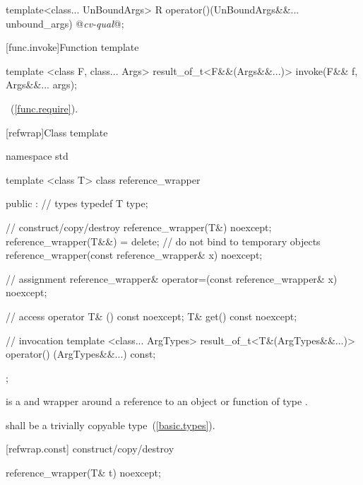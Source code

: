 \begin{codeblock}
template<class... UnBoundArgs>
R operator()(UnBoundArgs&&... unbound_args) @\textit{cv-qual}@;
\end{codeblock}
\exitnote

[func.invoke]{Function template }
%
%
\begin{itemdecl}
template <class F, class... Args>
  result_of_t<F&&(Args&&...)> invoke(F&& f, Args&&... args);
\end{itemdecl}

\begin{itemdescr}
\pnum
\returns
{}~(\ref{func.require}).
\end{itemdescr}

[refwrap]{Class template }

%
%
%
%
\begin{codeblock}
namespace std {
  template <class T> class reference_wrapper {
  public :
    // types
    typedef T type;

    // construct/copy/destroy
    reference_wrapper(T&) noexcept;
    reference_wrapper(T&&) = delete;     // do not bind to temporary objects
    reference_wrapper(const reference_wrapper& x) noexcept;

    // assignment
    reference_wrapper& operator=(const reference_wrapper& x) noexcept;

    // access
    operator T& () const noexcept;
    T& get() const noexcept;

    // invocation
    template <class... ArgTypes>
    result_of_t<T&(ArgTypes&&...)>
    operator() (ArgTypes&&...) const;
  };
}
\end{codeblock}

\pnum
{} is a  and  wrapper
around a reference to an object or function of type .

\pnum
{} shall be a trivially copyable type~(\ref{basic.types}).

[refwrap.const]{ construct/copy/destroy}

%
\begin{itemdecl}
reference_wrapper(T& t) noexcept;
\end{itemdecl}

